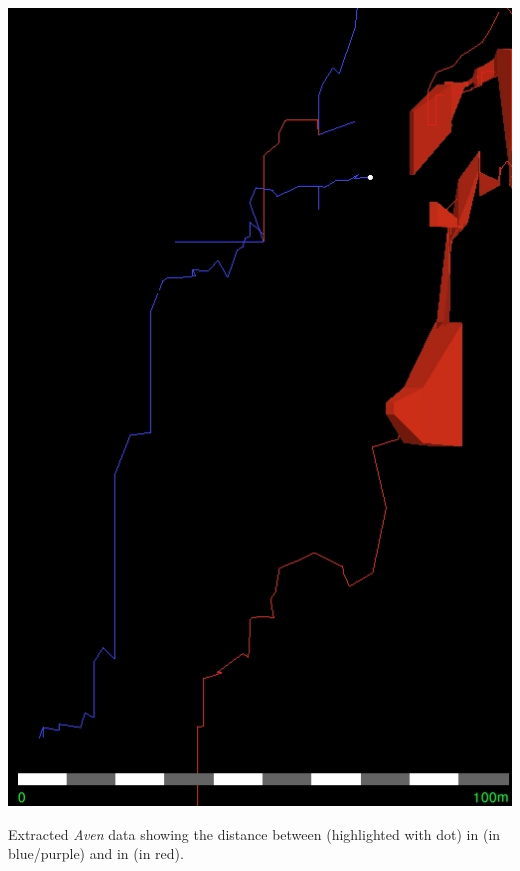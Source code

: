 \begin{survey}
\checkoddpage \ifoddpage \forcerectofloat \else \forceversofloat \fi
   \centering
\includegraphics[width = \textwidth]{2011/super_action/m2-captk-2011--orig.jpg}
\caption[2011 Proximity of Wizard and Oz and Dark Tranquillity]{Extracted \textit{Aven} data showing the distance between  (highlighted with dot) in  (in blue/purple) and  in  (in red).} \label{M2CptK2011}
\end{survey}


\newpage



